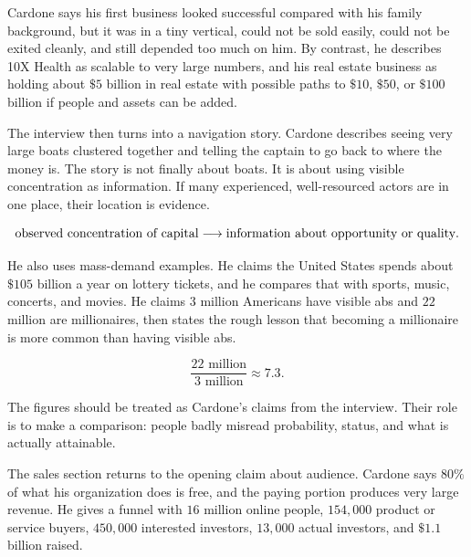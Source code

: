 Cardone says his first business looked successful compared with his family background, but it was in a tiny vertical, could not be sold easily, could not be exited cleanly, and still depended too much on him. By contrast, he describes 10X Health as scalable to very large numbers, and his real estate business as holding about \(\$5\) billion in real estate with possible paths to \(\$10\), \(\$50\), or \(\$100\) billion if people and assets can be added.

The interview then turns into a navigation story. Cardone describes seeing very large boats clustered together and telling the captain to go back to where the money is. The story is not finally about boats. It is about using visible concentration as information. If many experienced, well-resourced actors are in one place, their location is evidence.

\[
\hbox{observed concentration of capital}
\longrightarrow
\hbox{information about opportunity or quality}.
\]

He also uses mass-demand examples. He claims the United States spends about \(\$105\) billion a year on lottery tickets, and he compares that with sports, music, concerts, and movies. He claims \(3\) million Americans have visible abs and \(22\) million are millionaires, then states the rough lesson that becoming a millionaire is more common than having visible abs.

\begin{equation}
\frac{22\text{ million}}{3\text{ million}}
\approx
7.3.
\end{equation}

The figures should be treated as Cardone's claims from the interview. Their role is to make a comparison: people badly misread probability, status, and what is actually attainable.

The sales section returns to the opening claim about audience. Cardone says \(80\%\) of what his organization does is free, and the paying portion produces very large revenue. He gives a funnel with \(16\) million online people, \(154{,}000\) product or service buyers, \(450{,}000\) interested investors, \(13{,}000\) actual investors, and \(\$1.1\) billion raised.

